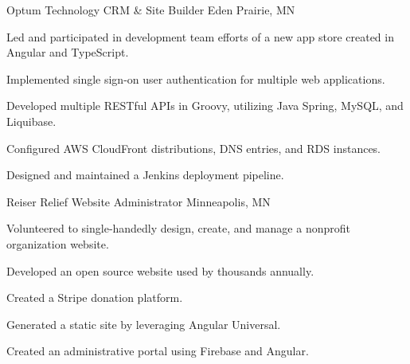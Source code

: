 \begin{cventries}
    \cventry
    {Optum Technology} %
    {CRM \& Site Builder} %
    {Eden Prairie, MN} %
    {} %
    {
    \begin{cvitems} %
        \item {Led and participated in development team efforts of a new app store created in Angular and TypeScript.}
        \item {Implemented single sign-on user authentication for multiple web applications.}
        \item {Developed multiple RESTful APIs in Groovy, utilizing Java Spring, MySQL, and Liquibase.}
        \item {Configured AWS CloudFront distributions, DNS entries, and RDS instances.}
        \item {Designed and maintained a Jenkins deployment pipeline.}
    \end{cvitems}
    }

    \cventry
    {Reiser Relief} %
    {Website Administrator} %
    {Minneapolis, MN} %
    {} %
    {
    \begin{cvitems} %
        \item {Volunteered to single‑handedly design, create, and manage a nonprofit organization website.}
        \item {Developed an open source website used by thousands annually.}
        \item {Created a Stripe donation platform.}
        \item {Generated a static site by leveraging Angular Universal.}
        \item {Created an administrative portal using Firebase and Angular.}
    \end{cvitems}
    }

\end{cventries}
